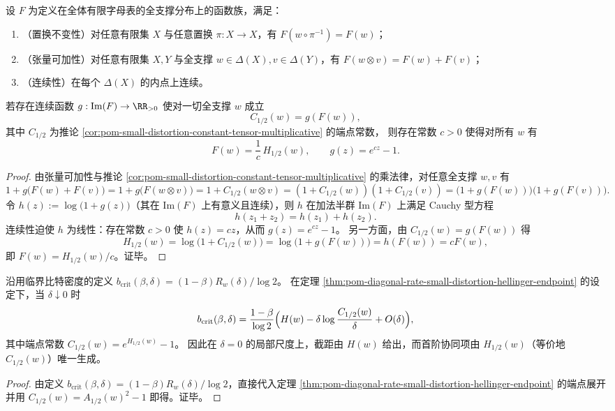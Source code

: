 \begin{theorem}[小失真协同常数的唯一张量生成元]\label{thm:pom-small-distortion-synergy-unique-additive-generator}
设 \(F\) 为定义在全体有限字母表的全支撑分布上的函数族，满足：
\begin{enumerate}
  \item \textup{（置换不变性）}对任意有限集 \(X\) 与任意置换 \(\pi:X\to X\)，有 \(F(w\circ\pi^{-1})=F(w)\)；
  \item \textup{（张量可加性）}对任意有限集 \(X,Y\) 与全支撑 \(w\in\Delta(X),v\in\Delta(Y)\)，有 \(F(w\otimes v)=F(w)+F(v)\)；
  \item \textup{（连续性）}在每个 \(\Delta(X)\) 的内点上连续。
\end{enumerate}
若存在连续函数 \(g:\mathrm{Im}(F)\to\RR_{>0}\) 使对一切全支撑 \(w\) 成立
\[
C_{1/2}(w)=g(F(w)),
\]
其中 \(C_{1/2}\) 为推论 \ref{cor:pom-small-distortion-constant-tensor-multiplicative} 的端点常数，
则存在常数 \(c>0\) 使得对所有 \(w\) 有
\[
F(w)=\frac{1}{c}\,H_{1/2}(w),
\qquad
g(z)=e^{cz}-1.
\]
\end{theorem}
\begin{proof}
由张量可加性与推论 \ref{cor:pom-small-distortion-constant-tensor-multiplicative} 的乘法律，对任意全支撑 \(w,v\) 有
\[
1+g\!\bigl(F(w)+F(v)\bigr)
=1+g\!\bigl(F(w\otimes v)\bigr)
=1+C_{1/2}(w\otimes v)
=(1+C_{1/2}(w))(1+C_{1/2}(v))
=\bigl(1+g(F(w))\bigr)\bigl(1+g(F(v))\bigr).
\]
令 \(h(z):=\log\bigl(1+g(z)\bigr)\)（其在 \(\mathrm{Im}(F)\) 上有意义且连续），则 \(h\) 在加法半群 \(\mathrm{Im}(F)\) 上满足 Cauchy 型方程
\[
h(z_1+z_2)=h(z_1)+h(z_2).
\]
连续性迫使 \(h\) 为线性：存在常数 \(c>0\) 使 \(h(z)=cz\)，从而 \(g(z)=e^{cz}-1\)。
另一方面，由 \(C_{1/2}(w)=g(F(w))\) 得
\[
H_{1/2}(w)=\log\bigl(1+C_{1/2}(w)\bigr)=\log\bigl(1+g(F(w))\bigr)=h(F(w))=cF(w),
\]
即 \(F(w)=H_{1/2}(w)/c\)。证毕。
\end{proof}

\begin{corollary}[临界比特密度在小失真端的局部展开]\label{cor:pom-bcrit-small-distortion-expansion}
沿用临界比特密度的定义
\(
b_{\mathrm{crit}}(\beta,\delta)=(1-\beta)R_w(\delta)/\log 2
\)。
在定理 \ref{thm:pom-diagonal-rate-small-distortion-hellinger-endpoint} 的设定下，当 \(\delta\downarrow 0\) 时
\[
b_{\mathrm{crit}}(\beta,\delta)
=\frac{1-\beta}{\log 2}\Bigl(H(w)-\delta\log\frac{C_{1/2}(w)}{\delta}+O(\delta)\Bigr),
\]
其中端点常数 \(C_{1/2}(w)=e^{H_{1/2}(w)}-1\)。
因此在 \(\delta=0\) 的局部尺度上，截距由 \(H(w)\) 给出，而首阶协同项由 \(H_{1/2}(w)\)（等价地 \(C_{1/2}(w)\)）唯一生成。
\end{corollary}
\begin{proof}
由定义 \(b_{\mathrm{crit}}(\beta,\delta)=(1-\beta)R_w(\delta)/\log 2\)，直接代入定理 \ref{thm:pom-diagonal-rate-small-distortion-hellinger-endpoint} 的端点展开并用 \(C_{1/2}(w)=A_{1/2}(w)^2-1\) 即得。证毕。
\end{proof}

